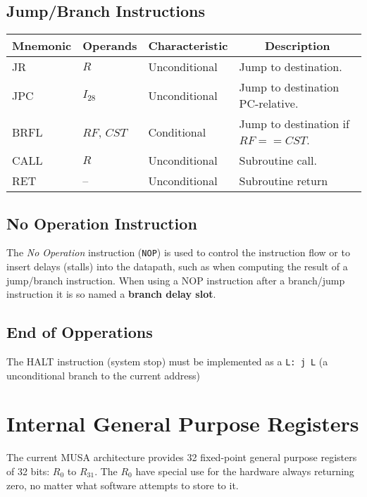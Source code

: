 \documentclass{article}
\begin{document}
  \subsection{Jump/Branch Instructions}

  \FloatBarrier
    \begin{table}[H]
      \begin{center}
		\begin{tabular}[pos]{| l | l | l | l |} \hline 	
	\multicolumn{1}{|c|}{\cellcolor[gray]{0.9}\textbf{Mnemonic}} &
	\multicolumn{1}{c|}{\cellcolor[gray]{0.9}\textbf{Operands}} &
	\multicolumn{1}{c|}{\cellcolor[gray]{0.9}\textbf{Characteristic}} &
	\multicolumn{1}{c|}{\cellcolor[gray]{0.9}\textbf{Description}} 			\\ \hline
	  JR  	& $R$ 		& Unconditional & Jump to destination. 			\\ \hline
	  JPC 	& $I_{28}$ 	& Unconditional & Jump to destination PC-relative. 	\\ \hline
	  BRFL 	& $RF$, $CST$ 	& Conditional 	& Jump to destination if $RF == CST$.\\ \hline
	  CALL   	& $R$		& Unconditional & Subroutine call.	\\ \hline
	  RET  	& -- 		& Unconditional & Subroutine return 			\\ \hline
	\end{tabular}
      \end{center}
    \end{table} 
   
  \subsection{No Operation Instruction}
  The \textit{No Operation} instruction (\texttt{NOP}) is used to control the instruction flow or to insert delays (stalls) into the datapath, such as when computing the result of a jump/branch instruction. When using a NOP instruction after a branch/jump instruction it is so named a \textbf{branch delay slot}.
  
  \subsection{End of Opperations}
  The HALT instruction (system stop) must be implemented as a \texttt{L: j L} (a unconditional branch to the current address)
  
  \section{Internal General Purpose Registers}
  \label{sec:register}
  The current MUSA architecture provides 32 fixed-point general purpose registers of 32 bits: $R_0$ to $R_{31}$. The $R_0$ have special use for the hardware always returning zero, no matter what software attempts to store to it.
\end{document}
